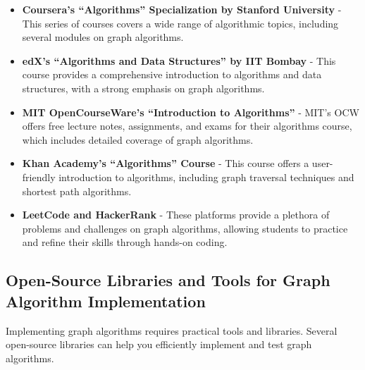 \documentclass[12pt]{book} %
\begin{document}
\begin{itemize}
    \item \textbf{Coursera’s “Algorithms” Specialization by Stanford University} - This series of courses covers a wide range of algorithmic topics, including several modules on graph algorithms.
    \item \textbf{edX’s “Algorithms and Data Structures” by IIT Bombay} - This course provides a comprehensive introduction to algorithms and data structures, with a strong emphasis on graph algorithms.
    \item \textbf{MIT OpenCourseWare’s “Introduction to Algorithms”} - MIT’s OCW offers free lecture notes, assignments, and exams for their algorithms course, which includes detailed coverage of graph algorithms.
    \item \textbf{Khan Academy’s “Algorithms” Course} - This course offers a user-friendly introduction to algorithms, including graph traversal techniques and shortest path algorithms.
    \item \textbf{LeetCode and HackerRank} - These platforms provide a plethora of problems and challenges on graph algorithms, allowing students to practice and refine their skills through hands-on coding.
\end{itemize}

\subsection{Open-Source Libraries and Tools for Graph Algorithm Implementation}
Implementing graph algorithms requires practical tools and libraries. Several open-source libraries can help you efficiently implement and test graph algorithms.
\end{document}
